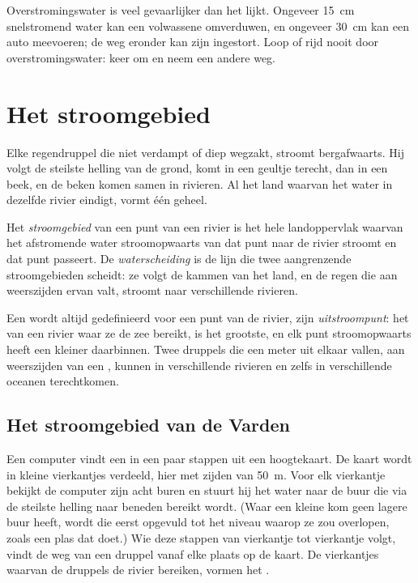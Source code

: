 \begin{safety}
Overstromingswater is veel gevaarlijker dan het lijkt. Ongeveer \qty{15}{cm}
snelstromend water kan een volwassene omverduwen, en ongeveer \qty{30}{cm} kan
een auto meevoeren; de weg eronder kan zijn ingestort. Loop of rijd nooit door
overstromingswater: keer om en neem een andere weg.
\end{safety}

\section{Het stroomgebied}

Elke regendruppel die niet verdampt of diep wegzakt, stroomt bergafwaarts. Hij
volgt de steilste helling van de grond, komt in een geultje terecht, dan in een
beek, en de beken komen samen in rivieren. Al het land waarvan het water in
dezelfde rivier eindigt, vormt één geheel.

\begin{definition}\label{def:g10:drainage-basins:drainage-basin}
Het \emph{stroomgebied} van een punt van een rivier is het
hele landoppervlak waarvan het afstromende water stroomopwaarts van dat punt
naar de rivier stroomt en dat punt passeert. De
\emph{waterscheiding} is de lijn die twee aangrenzende
stroomgebieden scheidt: ze volgt de kammen van het land, en de regen die aan
weerszijden ervan valt, stroomt naar verschillende rivieren.
\end{definition}

Een  wordt altijd gedefinieerd voor een punt van de rivier, zijn
\emph{uitstroompunt}: het  van een rivier waar ze de zee bereikt, is
het grootste, en elk punt stroomopwaarts heeft een kleiner  daarbinnen.
Twee druppels die een meter uit elkaar vallen, aan weerszijden van een
, kunnen in verschillende rivieren en zelfs in verschillende
oceanen terechtkomen.

\subsection*{Het stroomgebied van de Varden}

Een computer vindt een  in een paar stappen uit een hoogtekaart. De
kaart wordt in kleine vierkantjes verdeeld, hier met zijden van \qty{50}{m}.
Voor elk vierkantje bekijkt de computer zijn acht buren en stuurt hij het water
naar de buur die via de steilste helling naar beneden bereikt wordt. (Waar een
kleine kom geen lagere buur heeft, wordt die eerst opgevuld tot het niveau
waarop ze zou overlopen, zoals een plas dat doet.) Wie deze stappen van
vierkantje tot vierkantje volgt, vindt de weg van een druppel vanaf elke plaats
op de kaart. De vierkantjes waarvan de druppels de rivier bereiken, vormen het
.

